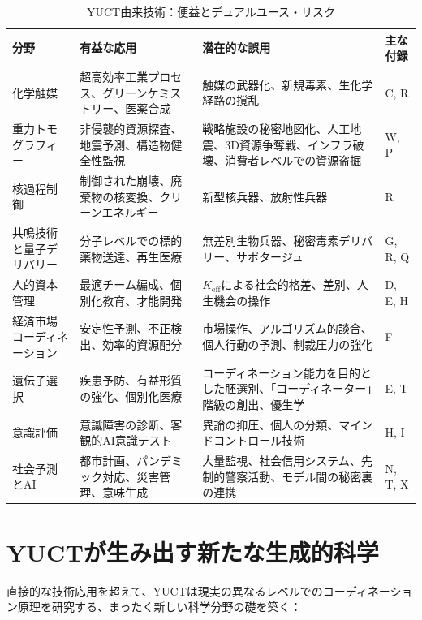 \documentclass[12pt,a4paper]{article}
\theoremstyle{remark}
\newcommand{\Keff}{K_{\mathrm{eff}}}
\begin{document}
	\begin{table}[htbp]
		\centering
		\caption{YUCT由来技術：便益とデュアルユース・リスク}
		\label{tab:tech-summary}
		\small
		\begin{tabularx}{\textwidth}{p{2.8cm}Xp{3.5cm}p{2.5cm}}
			\toprule
			\textbf{分野} & \textbf{有益な応用} & \textbf{潜在的な誤用} & \textbf{主な付録} \\
			\midrule
			化学触媒 & 超高効率工業プロセス、グリーンケミストリー、医薬合成 & 触媒の武器化、新規毒素、生化学経路の撹乱 & C, R \\
			重力トモグラフィー & 非侵襲的資源探査、地震予測、構造物健全性監視 & 戦略施設の秘密地図化、人工地震、3D資源争奪戦、インフラ破壊、消費者レベルでの資源盗掘 & W, P \\
			核過程制御 & 制御された崩壊、廃棄物の核変換、クリーンエネルギー & 新型核兵器、放射性兵器 & R \\
			共鳴技術と量子デリバリー & 分子レベルでの標的薬物送達、再生医療 & 無差別生物兵器、秘密毒素デリバリー、サボタージュ & G, R, Q \\
			人的資本管理 & 最適チーム編成、個別化教育、才能開発 & \(\Keff\)による社会的格差、差別、人生機会の操作 & D, E, H \\
			経済市場コーディネーション & 安定性予測、不正検出、効率的資源配分 & 市場操作、アルゴリズム的談合、個人行動の予測、制裁圧力の強化 & F \\
			遺伝子選択 & 疾患予防、有益形質の強化、個別化医療 & コーディネーション能力を目的とした胚選別、「コーディネーター」階級の創出、優生学 & E, T \\
			意識評価 & 意識障害の診断、客観的AI意識テスト & 異論の抑圧、個人の分類、マインドコントロール技術 & H, I \\
			社会予測とAI & 都市計画、パンデミック対応、災害管理、意味生成 & 大量監視、社会信用システム、先制的警察活動、モデル間の秘密裏の連携 & N, T, X \\
			\bottomrule
		\end{tabularx}
	\end{table}
	
	\section{YUCTが生み出す新たな生成的科学}
	\label{sec:generative}
	
	直接的な技術応用を超えて、YUCTは現実の異なるレベルでのコーディネーション原理を研究する、まったく新しい科学分野の礎を築く：
	
\end{document}
